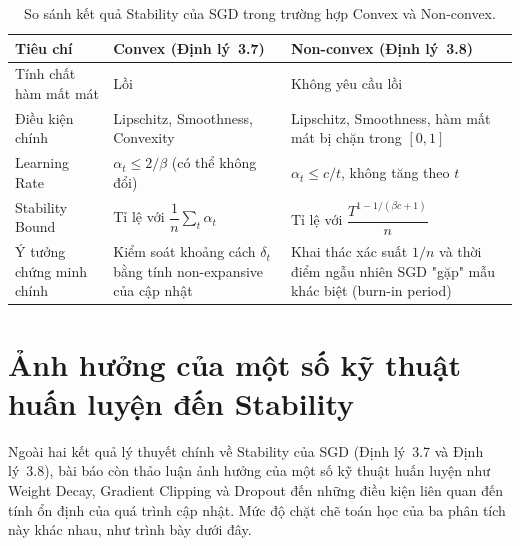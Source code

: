 \begin{table}[H]
\centering
\caption{So sánh kết quả Stability của SGD trong trường hợp Convex và Non-convex.}
\label{tab:sosanh-convex-nonconvex}
\begin{tabular}{|p{2.8cm}|p{5.2cm}|p{5.2cm}|}
\hline
\textbf{Tiêu chí} & \textbf{Convex (Định lý~3.7)} & \textbf{Non-convex (Định lý~3.8)} \\ \hline
Tính chất hàm mất mát & Lồi & Không yêu cầu lồi \\ \hline
Điều kiện chính & Lipschitz, Smoothness, Convexity & Lipschitz, Smoothness, hàm mất mát bị chặn trong $[0,1]$ \\ \hline
Learning Rate & $\alpha_t \leq 2/\beta$ (có thể không đổi) & $\alpha_t \leq c/t$, không tăng theo $t$ \\ \hline
Stability Bound & Tỉ lệ với $\dfrac{1}{n}\sum_t \alpha_t$ & Tỉ lệ với $\dfrac{T^{1 - 1/(\beta c+1)}}{n}$ \\ \hline
Ý tưởng chứng minh chính & Kiểm soát khoảng cách $\delta_t$ bằng tính non-expansive của cập nhật & Khai thác xác suất $1/n$ và thời điểm ngẫu nhiên SGD "gặp" mẫu khác biệt (burn-in period) \\ \hline
\end{tabular}
\end{table}

\section{Ảnh hưởng của một số kỹ thuật huấn luyện đến Stability}
\label{sec:kythuat-stability}

Ngoài hai kết quả lý thuyết chính về Stability của SGD (Định lý~3.7 và Định lý~3.8), bài báo còn thảo luận ảnh hưởng của một số kỹ thuật huấn luyện như Weight Decay, Gradient Clipping và Dropout đến những điều kiện liên quan đến tính ổn định của quá trình cập nhật. Mức độ chặt chẽ toán học của ba phân tích này khác nhau, như trình bày dưới đây.

